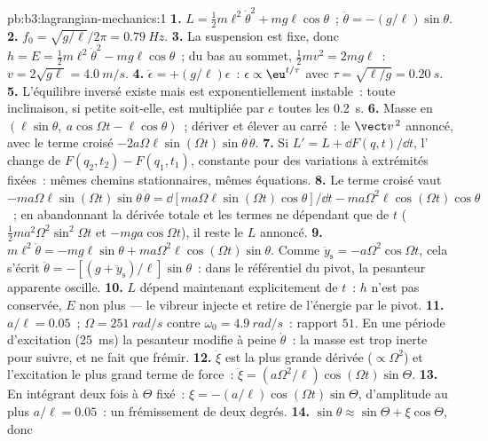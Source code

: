 \begin{solution}{pb:b3:lagrangian-mechanics:1}
\textbf{1.} $L = \tfrac12 m\ell^2\dot\theta^2 + mg\ell\cos\theta$~;
$\ddot\theta = -(g/\ell)\sin\theta$.
\textbf{2.} $f_0 = \sqrt{g/\ell}/2\pi = \qty{0.79}{Hz}$.
\textbf{3.} La suspension est fixe, donc $h = E = \tfrac12
m\ell^2\dot\theta^2 - mg\ell\cos\theta$~; du bas au sommet, $\tfrac12
mv^2 = 2mg\ell$~: $v = 2\sqrt{g\ell} = \qty{4.0}{m/s}$.
\textbf{4.} $\ddot\epsilon = +(g/\ell)\epsilon$~: $\epsilon \propto
\eu^{t/\tau}$ avec $\tau = \sqrt{\ell/g} = \qty{0.20}{s}$.
\textbf{5.} L'équilibre inversé existe mais est exponentiellement
instable~: toute inclinaison, si petite soit-elle, est multipliée par $e$ toutes les
\qty{0.2}{s}.
\textbf{6.} Masse en $(\ell\sin\theta,\ a\cos\Omega t - \ell\cos\theta)$~;
dériver et élever au carré~: le $\vect v^{\,2}$ annoncé, avec le terme
croisé $-2a\Omega\ell\sin(\Omega t)\sin\theta\,\dot\theta$.
\textbf{7.} Si $L' = L + \dd F(q,t)/\dd t$, l' change de
$F(q_2, t_2) - F(q_1, t_1)$, constante pour des variations à extrémités
fixées~: mêmes chemins stationnaires, mêmes équations.
\textbf{8.} Le terme croisé vaut $-ma\Omega\ell\sin(\Omega t)\sin\theta\,
\dot\theta = \dd[ma\Omega\ell\sin(\Omega t)\cos\theta]/\dd t -
ma\Omega^2\ell\cos(\Omega t)\cos\theta$~; en abandonnant la dérivée totale
et les termes ne dépendant que de $t$ ($\tfrac12 ma^2\Omega^2\sin^2\Omega t$ et
$-mga\cos\Omega t$), il reste le $L$ annoncé.
\textbf{9.} $m\ell^2\ddot\theta = -mg\ell\sin\theta +
ma\Omega^2\ell\cos(\Omega t)\sin\theta$. Comme $\ddot y_{\text{s}} =
-a\Omega^2\cos\Omega t$, cela s'écrit $\ddot\theta =
-[(g + \ddot y_{\text{s}})/\ell]\sin\theta$~: dans le référentiel du
pivot, la pesanteur apparente oscille.
\textbf{10.} $L$ dépend maintenant explicitement de $t$~: $h$ n'est pas
conservée, $E$ non plus --- le vibreur injecte et retire de l'énergie par le pivot.
\textbf{11.} $a/\ell = 0.05$~; $\Omega = \qty{251}{rad/s}$ contre
$\omega_0 = \qty{4.9}{rad/s}$~: rapport $51$. En une période d'excitation
(\qty{25}{ms}) la pesanteur modifie à peine $\dot\theta$~: la masse est trop
inerte pour suivre, et ne fait que frémir.
\textbf{12.} $\ddot\xi$ est la plus grande dérivée ($\propto\Omega^2$)
et l'excitation le plus grand terme de force~: $\ddot\xi =
(a\Omega^2/\ell)\cos(\Omega t)\sin\Theta$.
\textbf{13.} En intégrant deux fois à $\Theta$ fixé~: $\xi =
-(a/\ell)\cos(\Omega t)\sin\Theta$, d'amplitude au plus $a/\ell =
0.05$~: un frémissement de deux degrés.
\textbf{14.} $\sin\theta \approx \sin\Theta + \xi\cos\Theta$, donc

\end{solution}
